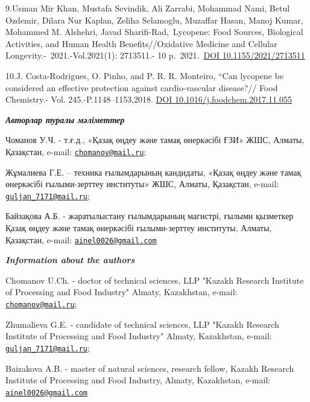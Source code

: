 9.Usman Mir Khan, Mustafa Sevindik, Ali Zarrabi, Mohammad Nami, Betul
Ozdemir, Dilara Nur Kaplan, Zeliha Selamoglu, Muzaffar Hasan, Manoj
Kumar, Mohammed M. Alshehri, Javad Sharifi-Rad,~Lycopene: Food Sources,
Biological Activities, and Human Health Benefits//Oxidative Medicine and
Cellular Longevity.-~2021.-Vol.2021(1): 2713511.- 10
p.~2021.~\href{https://doi.org/10.1155/2021/2713511}{DOI
10.1155/2021/2713511}

10.J. Costa-Rodrigues, O. Pinho, and P. R. R. Monteiro, ``Can lycopene
be considered an eﬀective protection against cardio-vascular disease?//
Food Chemistry.- Vol. 245.-P.1148--1153,2018.
\href{https://doi.org/10.1155/2021/2713511}{DOI
10.1016/j.foodchem.2017.11.055}

\emph{{\bfseries Авторлар туралы мәліметтер}}

Чоманов У.Ч. - т.ғ.д., «Қазақ өңдеу және тамақ өнеркәсібі ҒЗИ» ЖШС,
Алматы, Қазақстан, e-mail:
\href{mailto:сhomanov@mail.ru}{\nolinkurl{сhomanov@mail.ru}};

Жұмалиева Г.Е. -- техника ғылымдарының кандидаты, «Қазақ өңдеу және
тамақ өнеркәсібі ғылыми-зерттеу институты» ЖШС, Алматы, Қазақстан,
e-mail:
\href{mailto:guljan_7171@mail.ru}{\nolinkurl{guljan\_7171@mail.ru}};

Байзақова А.Б. - жаратылыстану ғылымдарының магистрі, ғылыми қызметкер
Қазақ өңдеу және тамақ өнеркәсібі ғылыми-зерттеу институты, Алматы,
Қазақстан, e-mail:
\href{mailto:ainel0026@gmail.com}{\nolinkurl{ainel0026@gmail.com}}

\emph{{\bfseries Information about the authors}}

Chomanov U.Ch. - doctor of technical sciences, LLP "Kazakh Research
Institute of Processing and Food Industry" Almaty, Kazakhstan, e-mail:
\href{mailto:сhomanov@mail.ru}{\nolinkurl{сhomanov@mail.ru}};

Zhumalieva G.E. - candidate of technical sciences, LLP "Kazakh Research
Institute of Processing and Food Industry" Almaty, Kazakhstan, e-mail:
\href{mailto:guljan_7171@mail.ru}{\nolinkurl{guljan\_7171@mail.ru}};

Baizakova A.B. - master of natural sciences, research fellow, Kazakh
Research Institute of Processing and Food Industry, Almaty, Kazakhstan,
e-mail:
\href{mailto:ainel0026@gmail.com}{\nolinkurl{ainel0026@gmail.com}}
